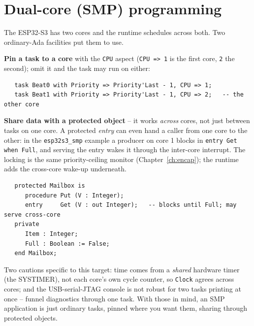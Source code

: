\section{Dual-core (SMP) programming}
\label{sec:smp}

The ESP32-S3 has two cores and the runtime schedules across both. Two ordinary-Ada
facilities put them to use.

\textbf{Pin a task to a core} with the \texttt{CPU} aspect (\texttt{CPU => 1} is
the first core, \texttt{2} the second); omit it and the task may run on either:

\begin{lstlisting}
   task Beat0 with Priority => Priority'Last - 1, CPU => 1;
   task Beat1 with Priority => Priority'Last - 1, CPU => 2;   -- the other core
\end{lstlisting}

\textbf{Share data with a protected object} -- it works \emph{across} cores, not
just between tasks on one core. A protected \emph{entry} can even hand a caller
from one core to the other: in the \texttt{esp32s3\_smp} example a producer on
core 1 blocks in \texttt{entry Get when Full}, and serving the entry wakes it
through the inter-core interrupt. The locking is the same priority-ceiling monitor
(Chapter~\ref{ch:encap}); the runtime adds the cross-core wake-up underneath.

\begin{lstlisting}
   protected Mailbox is
      procedure Put (V : Integer);
      entry     Get (V : out Integer);   -- blocks until Full; may serve cross-core
   private
      Item : Integer;
      Full : Boolean := False;
   end Mailbox;
\end{lstlisting}

Two cautions specific to this target: time comes from a \emph{shared} hardware
timer (the SYSTIMER), not each core's own cycle counter, so \texttt{Clock} agrees
across cores; and the USB-serial-JTAG console is not robust for two tasks printing
at once -- funnel diagnostics through one task. With those in mind, an SMP
application is just ordinary tasks, pinned where you want them, sharing through
protected objects.

